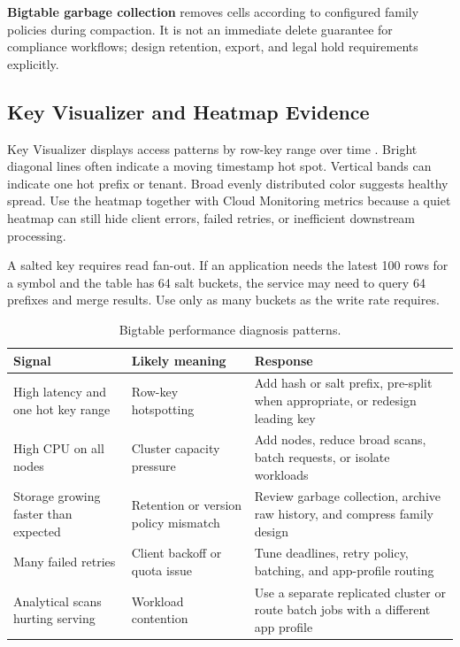 \begin{definitionbox}
\textbf{Bigtable garbage collection} removes cells according to configured family policies during compaction. It is not an immediate delete guarantee for compliance workflows; design retention, export, and legal hold requirements explicitly.
\end{definitionbox}

\subsection{Key Visualizer and Heatmap Evidence}
Key Visualizer displays access patterns by row-key range over time \cite{googlecloudbigtablekeyvisualizer}. Bright diagonal lines often indicate a moving timestamp hot spot. Vertical bands can indicate one hot prefix or tenant. Broad evenly distributed color suggests healthy spread. Use the heatmap together with Cloud Monitoring metrics because a quiet heatmap can still hide client errors, failed retries, or inefficient downstream processing.

\begin{pitfall}
A salted key requires read fan-out. If an application needs the latest 100 rows for a symbol and the table has 64 salt buckets, the service may need to query 64 prefixes and merge results. Use only as many buckets as the write rate requires.
\end{pitfall}

\begin{table}[H]
\centering
\small
\begin{tabular}{@{}p{3.0cm}p{4.8cm}p{4.8cm}@{}}
\toprule
\textbf{Signal} & \textbf{Likely meaning} & \textbf{Response} \\
\midrule
High latency and one hot key range & Row-key hotspotting & Add hash or salt prefix, pre-split when appropriate, or redesign leading key \\
High CPU on all nodes & Cluster capacity pressure & Add nodes, reduce broad scans, batch requests, or isolate workloads \\
Storage growing faster than expected & Retention or version policy mismatch & Review garbage collection, archive raw history, and compress family design \\
Many failed retries & Client backoff or quota issue & Tune deadlines, retry policy, batching, and app-profile routing \\
Analytical scans hurting serving & Workload contention & Use a separate replicated cluster or route batch jobs with a different app profile \\
\bottomrule
\end{tabular}
\caption{Bigtable performance diagnosis patterns.}
\label{tab:bigtable-performance-diagnosis}
\end{table}

